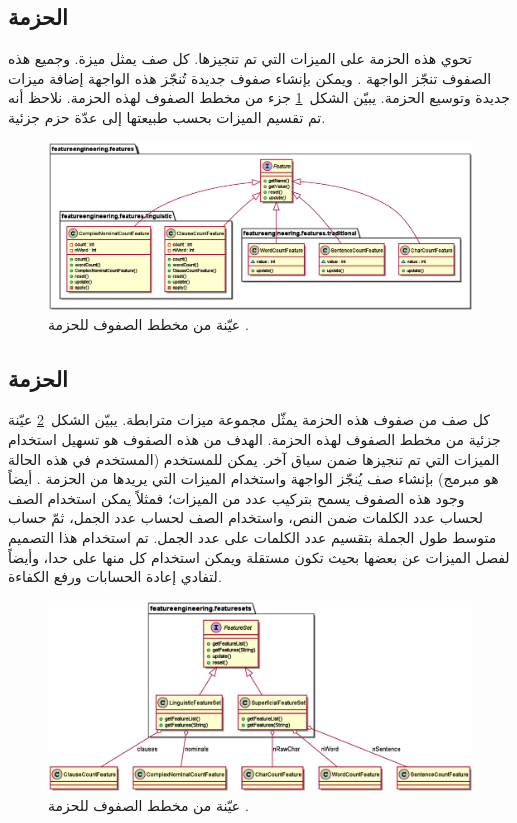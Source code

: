 \subsection{الحزمة }
تحوي هذه الحزمة على الميزات التي تم تنجيزها.
كل صف يمثل ميزة.
وجميع هذه الصفوف تنجّز الواجهة .
ويمكن بإنشاء صفوف جديدة تُنجّز هذه الواجهة إضافة ميزات جديدة وتوسيع الحزمة.
يبيّن الشكل~\ref{fig:cd:features} جزء من مخطط الصفوف لهذه الحزمة.
نلاحظ أنه تم تقسيم الميزات بحسب طبيعتها إلى عدّة حزم جزئية.

\begin{figure}[htb]
	\centering
	\includegraphics[width=0.95\linewidth]{images/cd-features.eps}
	\caption{%
		عيّنة من مخطط الصفوف للحزمة .
	}
	\label{fig:cd:features}
\end{figure}



\subsection{الحزمة }
كل صف من صفوف هذه الحزمة يمثّل مجموعة ميزات مترابطة.
يبيّن الشكل~\ref{fig:cd:featuresets} عيّنة جزئية من مخطط الصفوف لهذه الحزمة.
الهدف من هذه الصفوف هو تسهيل استخدام الميزات التي تم تنجيزها ضمن سياق آخر.
يمكن للمستخدم (المستخدم في هذه الحالة هو مبرمج) بإنشاء صف يُنجّز الواجهة 
واستخدام الميزات التي يريدها من الحزمة .
أيضاً وجود هذه الصفوف يسمح بتركيب عدد من الميزات؛
فمثلاً يمكن استخدام الصف  لحساب عدد الكلمات ضمن النص،
واستخدام الصف  لحساب عدد الجمل،
ثمّ حساب متوسط طول الجملة بتقسيم عدد الكلمات على عدد الجمل.
تم استخدام هذا التصميم لفصل الميزات عن بعضها بحيث تكون مستقلة ويمكن استخدام كل منها على حدا،
وأيضاً لتفادي إعادة الحسابات ورفع الكفاءة.


\begin{figure}[htb]
	\centering
	\includegraphics[width=0.95\linewidth]{images/cd-featuresets.eps}
	\caption{%
		عيّنة من مخطط الصفوف للحزمة .
	}
	\label{fig:cd:featuresets}
\end{figure}



